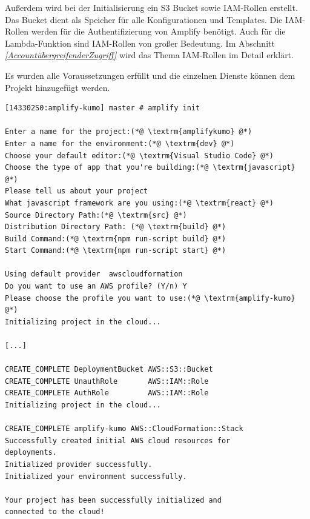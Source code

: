 Außerdem wird bei der Initialisierung ein S3 Bucket sowie IAM-Rollen erstellt.
Das Bucket dient als Speicher für alle Konfigurationen und Templates.
Die IAM-Rollen werden für die Authentifizierung von Amplify benötigt.
Auch für die Lambda-Funktion sind IAM-Rollen von großer Bedeutung.
Im Abschnitt \textit{\ref{AccountübergreifenderZugriff} } wird das Thema IAM-Rollen im Detail erklärt.

Es wurden alle Voraussetzungen erfüllt und die einzelnen Dienste können dem Projekt hinzugefügt werden.

\begin{lstlisting}[basicstyle=\ttfamily\small, breaklines=true , frame = single, backgroundcolor=\color{flashwhite} ]
[143302S0:amplify-kumo] master # amplify init

Enter a name for the project:(*@ \textrm{amplifykumo} @*)
Enter a name for the environment:(*@ \textrm{dev} @*)
Choose your default editor:(*@ \textrm{Visual Studio Code} @*)
Choose the type of app that you're building:(*@ \textrm{javascript} @*)
Please tell us about your project
What javascript framework are you using:(*@ \textrm{react} @*)
Source Directory Path:(*@ \textrm{src} @*)
Distribution Directory Path: (*@ \textrm{build} @*)
Build Command:(*@ \textrm{npm run-script build} @*)
Start Command:(*@ \textrm{npm run-script start} @*)

Using default provider  awscloudformation
Do you want to use an AWS profile? (Y/n) Y
Please choose the profile you want to use:(*@ \textrm{amplify-kumo} @*)
Initializing project in the cloud...

[...]

CREATE_COMPLETE DeploymentBucket AWS::S3::Bucket
CREATE_COMPLETE UnauthRole       AWS::IAM::Role
CREATE_COMPLETE AuthRole         AWS::IAM::Role
Initializing project in the cloud...

CREATE_COMPLETE amplify-kumo AWS::CloudFormation::Stack
Successfully created initial AWS cloud resources for
deployments.
Initialized provider successfully.
Initialized your environment successfully.

Your project has been successfully initialized and
connected to the cloud!

\end{lstlisting}


